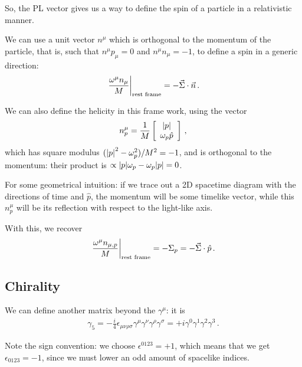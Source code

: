 \documentclass[main.tex]{subfiles}
\begin{document}

So, the PL vector gives us a way to define the spin of a particle in a relativistic manner. 

We can use a unit vector \(n^{\mu }\) which is orthogonal to the momentum of the particle, that is, such that \(n^{\mu } p_{\mu }=0\) and \(n^{\mu } n_{\mu }=-1\), to define a spin in a generic direction: 
%
\begin{align}
\eval{\frac{\omega^{\mu }n_{\mu }}{M}}_{\text{rest frame}} = - \vec{\Sigma} \cdot \vec{n}
\,.
\end{align}

We can also define the helicity in this frame work, using the vector 
%
\begin{subequations}
\begin{align}
n^{\mu }_{p} = \frac{1}{M} \left[\begin{array}{c}
\abs{p} \\ 
\omega_{p} \hat{p}
\end{array}\right]
\,,
\end{align}
\end{subequations}
%
which has square modulus \((\abs{p}^2 - \omega_{p}^2) / M^2 = -1\), and is orthogonal to the momentum: their product is \(\propto \abs{p} \omega_{p}  - \omega_{p} \abs{p} = 0\).

For some geometrical intuition: if we trace out a 2D spacetime diagram with the directions of time and \(\hat{p}\), the momentum will be some timelike vector, while this \(n^{\mu }_{p}\) will be its reflection with respect to the light-like axis.

With this, we recover 
%
\begin{align}
\eval{\frac{\omega^{\mu }n_{\mu , p}}{M}}_{\text{rest frame}}
= - \Sigma_{p} = - \vec{\Sigma} \cdot \hat{p}
\,.
\end{align}
%
\subsection{Chirality}

We can define another matrix beyond the \(\gamma^{\mu }\): it is 
%
\begin{align} \label{eq:gamma5-definition}
\gamma_{5} = - \frac{i}{4} \epsilon_{\mu \nu \rho \sigma } \gamma^{\mu } \gamma^{\nu } \gamma^{\rho } \gamma^{\sigma } = + i \gamma^{0} \gamma^{1} \gamma^{2} \gamma^{3}
\,.
\end{align}

Note the sign convention: we choose \(\epsilon^{0123} = +1 \), which means that we get \(\epsilon_{0123} = -1\), since we must lower an odd amount of spacelike indices.
\end{document}
